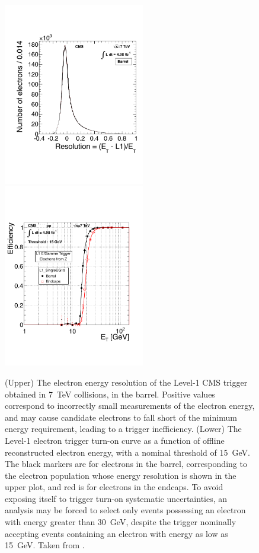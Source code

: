     \begin{figure}[h!]
      \centering
      \includegraphics[width=0.55\textwidth]{figures/L1_res.pdf}\\
      \includegraphics[width=0.55\textwidth]{figures/electron_turnon.pdf}
      \caption[Level-1 trigger electron energy resolution and associated turn-on curve.]{
        (Upper) The electron energy resolution of the Level-1 CMS trigger obtained in 7~TeV collisions, in the barrel.
        Positive values correspond to incorrectly small measurements of the electron energy, and may cause candidate electrons to fall short of the minimum energy requirement, leading to a trigger inefficiency.
        (Lower) The Level-1 electron trigger turn-on curve as a function of offline reconstructed electron energy, with a nominal threshold of 15~GeV.
        The black markers are for electrons in the barrel, corresponding to the electron population whose energy resolution is shown in the upper plot, and red is for electrons in the endcaps.
        To avoid exposing itself to trigger turn-on systematic uncertainties, an analysis may be forced to select only events possessing an electron with energy greater than 30~GeV, despite the trigger nominally accepting events containing an electron with energy as low as 15~GeV.
        Taken from \cite{trigger}.}
      \label{fig:L1res}
    \end{figure}      

